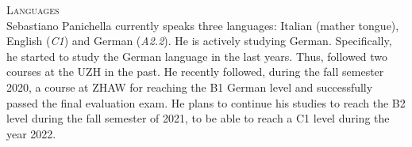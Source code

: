 \documentclass[12pt]{article}
\newcommand{\blankline}{\quad\pagebreak[3]}
\begin{document}
%
%
%

\vspace{3.5mm}

\textsc{Languages}\\

Sebastiano Panichella currently speaks three languages: Italian (mather tongue), English (\textit{C1}) and German (\textit{A2.2}). He is actively studying German. Specifically, he started to study the German language in the last years. Thus, followed two courses at the UZH in the past. He recently followed, during the fall semester 2020, a course at ZHAW for reaching the B1 German level and successfully passed the final evaluation exam. He plans to continue his studies to reach the B2 level during the fall semester of 2021, to be able to reach a C1 level during the year 2022.
\end{document}
